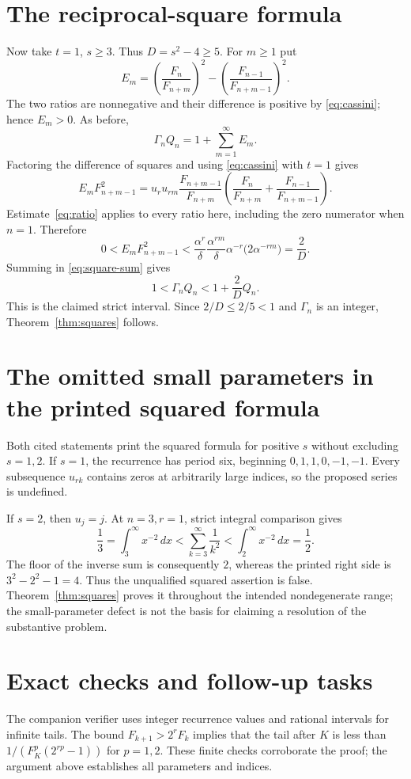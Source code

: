 \documentclass[11pt]{article}
\begin{document}
\section*{The reciprocal-square formula}
Now take $t=1$, $s\geq3$. Thus $D=s^2-4\geq5$.
For $m\geq1$ put
\[
E_m=\left(\frac{F_n}{F_{n+m}}\right)^2
     -\left(\frac{F_{n-1}}{F_{n+m-1}}\right)^2 .
\]
The two ratios are nonnegative and their difference is positive by
\eqref{eq:cassini}; hence $E_m>0$. As before,
\begin{equation}\label{eq:square-sum}
\Gamma_n Q_n=1+\sum_{m=1}^{\infty}E_m.
\end{equation}
Factoring the difference of squares and using \eqref{eq:cassini} with
$t=1$ gives
\[
E_mF_{n+m-1}^2
=u_r u_{rm}\frac{F_{n+m-1}}{F_{n+m}}
 \left(\frac{F_n}{F_{n+m}}+
       \frac{F_{n-1}}{F_{n+m-1}}\right).
\]
Estimate~\eqref{eq:ratio} applies to every ratio here, including the
zero numerator when $n=1$. Therefore
\[
0<E_mF_{n+m-1}^2
<\frac{\alpha^r}{\delta}\frac{\alpha^{rm}}{\delta}
 \alpha^{-r}\bigl(2\alpha^{-rm}\bigr)
=\frac2D.
\]
Summing in \eqref{eq:square-sum} gives
\[
1<\Gamma_n Q_n<1+\frac2D Q_n .
\]
This is the claimed strict interval. Since $2/D\leq2/5<1$ and
$\Gamma_n$ is an integer, Theorem~\ref{thm:squares} follows.

\section*{The omitted small parameters in the printed squared formula}
Both cited statements print the squared formula for positive $s$
without excluding $s=1,2$. If $s=1$, the recurrence has period six,
beginning $0,1,1,0,-1,-1$. Every subsequence $u_{rk}$ contains zeros
at arbitrarily large indices, so the proposed series is undefined.

If $s=2$, then $u_j=j$. At $n=3,r=1$, strict integral comparison gives
\[
\frac13=\int_3^\infty x^{-2}\,dx
<\sum_{k=3}^{\infty}\frac1{k^2}
<\int_2^\infty x^{-2}\,dx=\frac12 .
\]
The floor of the inverse sum is consequently $2$, whereas the printed
right side is $3^2-2^2-1=4$. Thus the unqualified squared assertion is
false. Theorem~\ref{thm:squares} proves it throughout the intended
nondegenerate range; the small-parameter defect is not the basis for
claiming a resolution of the substantive problem.

\section*{Exact checks and follow-up tasks}
The companion verifier uses integer recurrence values and rational
intervals for infinite tails. The bound
$F_{k+1}>2^rF_k$ implies that the tail after $K$ is less than
$1/(F_K^p(2^{rp}-1))$ for $p=1,2$. These finite checks corroborate the
proof; the argument above establishes all parameters and indices.
\end{document}
